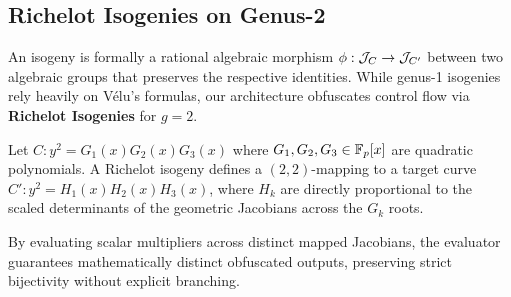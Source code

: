 \subsection{Richelot Isogenies on Genus-2}
An isogeny is formally a rational algebraic morphism $\phi: \mathcal{J}_C \to \mathcal{J}_{C'}$ between two algebraic groups that preserves the respective identities. While genus-1 isogenies rely heavily on V\'elu's formulas, our architecture obfuscates control flow via \textbf{Richelot Isogenies} for $g=2$.

\begin{definition}
Let $C: y^2 = G_1(x) G_2(x) G_3(x)$ where $G_1, G_2, G_3 \in \mathbb{F}_p[x]$ are quadratic polynomials. A Richelot isogeny defines a $(2,2)$-mapping to a target curve $C': y^2 = H_1(x) H_2(x) H_3(x)$, where $H_k$ are directly proportional to the scaled determinants of the geometric Jacobians across the $G_k$ roots.
\end{definition}

By evaluating scalar multipliers across distinct mapped Jacobians, the evaluator guarantees mathematically distinct obfuscated outputs, preserving strict bijectivity without explicit branching.
